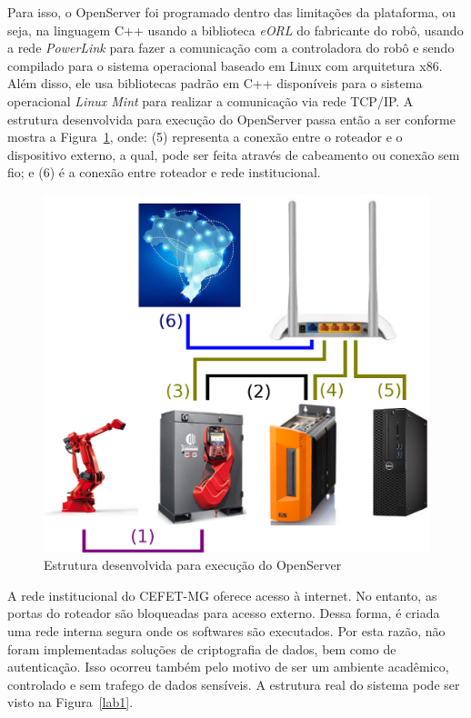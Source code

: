     Para isso, o OpenServer foi programado dentro das limitações da plataforma, ou seja, na linguagem C++ usando a biblioteca \textit{eORL} do fabricante do robô, usando a rede \textit{PowerLink} para fazer a comunicação com a controladora do robô e sendo compilado para o sistema operacional baseado em Linux com arquitetura x86. Além disso, ele usa bibliotecas padrão em C++ disponíveis para o sistema operacional \textit{Linux Mint} para realizar a comunicação via rede TCP/IP. A estrutura desenvolvida para execução do OpenServer passa então a ser conforme mostra a Figura~\ref{conexoes-openserver}, onde: (5) representa a conexão entre o roteador e o dispositivo externo, a qual, pode ser feita através de cabeamento ou conexão sem fio; e (6) é a conexão entre roteador e rede institucional.
    
    \begin{figure}[ht]
        \centering
        \includegraphics[width=\columnwidth]{imagens/Conexoes/conexoes-openserver.eps}
        \small 
        \centering 
        \caption{Estrutura desenvolvida para execução do OpenServer}
        
        \label{conexoes-openserver}
    \end{figure}
    
    
    A rede institucional do CEFET-MG oferece acesso à internet. No entanto, as portas do roteador são bloqueadas para acesso externo. Dessa forma, é criada uma rede interna segura onde os softwares são executados. Por esta razão, não foram implementadas soluções de criptografia de dados, bem como de autenticação. Isso ocorreu também pelo motivo de ser um ambiente acadêmico, controlado e sem trafego de dados sensíveis. A estrutura real do sistema pode ser visto na Figura~\ref{lab1}.
    
